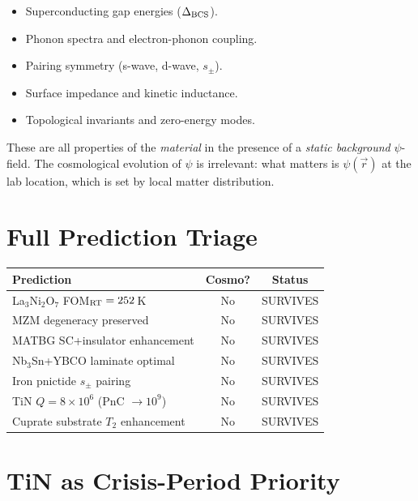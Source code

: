\documentclass[11pt]{article}
\begin{document}
\begin{itemize}
\item Superconducting gap energies ($\Delta_{\rm BCS}$).
\item Phonon spectra and electron-phonon coupling.
\item Pairing symmetry (s-wave, d-wave, $s_{\pm}$).
\item Surface impedance and kinetic inductance.
\item Topological invariants and zero-energy modes.
\end{itemize}

These are all properties of the \emph{material} in the presence of
a \emph{static background} $\psi$-field. The cosmological evolution
of $\psi$ is irrelevant: what matters is $\psi(\vec{r})$ at the
lab location, which is set by local matter distribution.

\section{Full Prediction Triage}

\begin{table}[h]
\centering
\begin{tabular}{lcc}
\toprule
\textbf{Prediction} & \textbf{Cosmo?} & \textbf{Status} \\
\midrule
La$_3$Ni$_2$O$_7$ FOM$_{\rm RT} = 252$\,K & No & SURVIVES \\
MZM degeneracy preserved & No & SURVIVES \\
MATBG SC+insulator enhancement & No & SURVIVES \\
Nb$_3$Sn+YBCO laminate optimal & No & SURVIVES \\
Iron pnictide $s_{\pm}$ pairing & No & SURVIVES \\
TiN $Q = 8 \times 10^6$ (PnC $\to 10^9$) & No & SURVIVES \\
Cuprate substrate $T_2$ enhancement & No & SURVIVES \\
\bottomrule
\end{tabular}
\end{table}

\section{TiN as Crisis-Period Priority}
\end{document}
